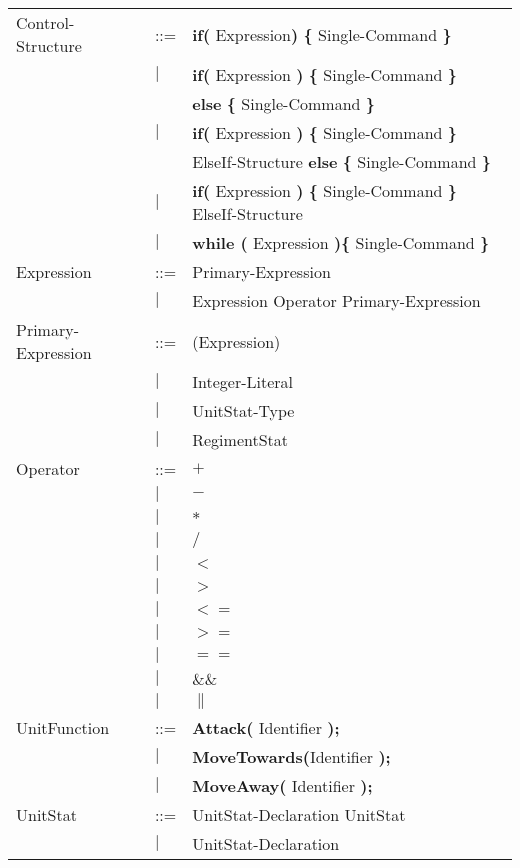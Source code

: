 \begin{center}
\begin{longtable}{l l l}
Control-Structure			&	::=	&{\bf if( } Expression{\bf )} {\bf \{ } Single-Command {\bf \} }  \\
							&$\mid$	&{\bf if(} Expression {\bf )} {\bf \{ }Single-Command {\bf \}} \\
							&		&{\bf else } {\bf \{ }Single-Command {\bf \} } \\			
							&$\mid$	&{\bf if(} Expression {\bf )} {\bf \{ }Single-Command {\bf \}} \\
							&		&ElseIf-Structure {\bf else } {\bf \{ }Single-Command {\bf \} } \\
							&$\mid$	&{\bf if(} Expression {\bf )} {\bf \{ }Single-Command {\bf \}} ElseIf-Structure \\	
							&$\mid$	&{\bf while (} Expression {\bf )}{\bf \{ } Single-Command {\bf \}} \\
Expression					&	::=	&Primary-Expression \\
							&$\mid$	&Expression Operator Primary-Expression \\
Primary-Expression			&	::=	&(Expression)\\
							&$\mid$	&Integer-Literal \\
							&$\mid$	&UnitStat-Type \\
							&$\mid$	&RegimentStat \\
Operator					&	::=	&$\boldsymbol {+}$\\
							&$\mid$	&$\boldsymbol {-}$\\
							&$\mid$	&$\boldsymbol {*}$\\
							&$\mid$	&$\boldsymbol {/}$\\
							&$\mid$	&$\boldsymbol {<}$\\
							&$\mid$	&$\boldsymbol {>}$\\
							&$\mid$	&$\boldsymbol {<=}$\\
							&$\mid$	&$\boldsymbol {>=}$\\
							&$\mid$	&$\boldsymbol {==}$\\
							&$\mid$	&$\boldsymbol {\&\&}$\\
							&$\mid$	&$\boldsymbol {\|}$\\
UnitFunction				&	::=	&{\bf Attack(} Identifier {\bf );} \\
							&$\mid$	&{\bf MoveTowards(}Identifier {\bf );} \\
							&$\mid$	&{\bf MoveAway(} Identifier {\bf );} \\
UnitStat					&	::=	&UnitStat-Declaration UnitStat \\
							&$\mid$	&UnitStat-Declaration \\

\end{longtable}
\end{center}
